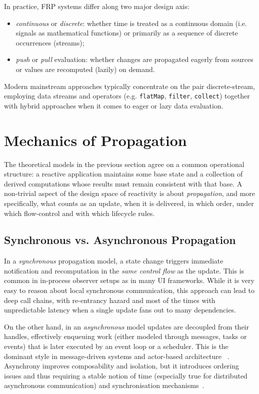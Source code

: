 In practice, \ac{FRP} systems differ along two major design axis:
\begin{itemize}
	\item \emph{continuous} or \emph{discrete}: whether time is treated as a
	      continuous domain (i.e. signals as mathematical functions) or primarily
	      as a sequence of discrete occurrences (streams);
	\item \emph{push} or \emph{pull} evaluation: whether changes are propagated
	      eagerly from sources or values are recomputed (lazily) on demand.
\end{itemize}
Modern mainstream approaches typically concentrate on the pair discrete-stream,
employing data streams and operators (e.g. \texttt{flatMap}, \texttt{filter},
\texttt{collect}) together with hybrid approaches when it comes to eager or
lazy data evaluation.

\section{Mechanics of Propagation}
The theoretical models in the previous section agree on a common operational
structure: a reactive application maintains some base state and a collection of
derived computations whose results must remain consistent with that base. A
non-trivial aspect of the design space of reactivity is about
\emph{propagation}, and more specifically, what counts as an update, when it is
delivered, in which order, under which flow-control and with which lifecycle
rules.

\subsection{Synchronous vs. Asynchronous Propagation}\label{ssec:sync_async}

In a \emph{synchronous} propagation model, a state change triggers immediate
notification and recomputation in the \emph{same control flow} as the update.
This is common in in-process observer setups as in many UI frameworks. While it
is very easy to reason about local synchronous communication, this approach can
lead to deep call chains, with re-entrancy hazard and most of the times with
unpredictable latency when a single update fans out to many dependencies.

On the other hand, in an \emph{asynchronous} model updates are decoupled from
their handles, effectively enqueuing work (either modeled through messages,
tasks or events) that is later executed by an event loop or a scheduler. This
is the dominant style in message-driven systems and actor-based architecture
~\cite{agha1986AMCCDS}. Asynchrony improves composability and isolation, but it
introduces ordering issues and thus requiring a stable notion of time
(especially true for distributed asynchronous communication) and
synchronisation mechanisms~\cite{lamport1978TCOEDS}.

